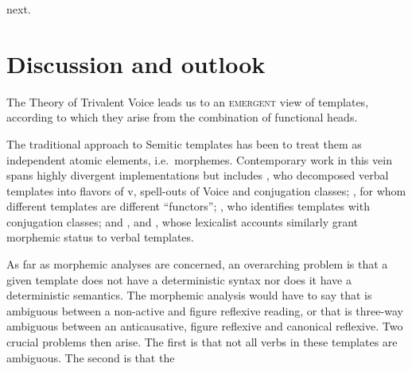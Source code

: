 \begin{exe}
\begin{xlist}
\begin{xlist}
\begin{exe}
\begin{xlist}
\begin{xlist}
\begin{exe}
\begin{xlist}
\begin{xlist}
\begin{exe}
\begin{exe}
\begin{xlist}
\begin{exe}
\begin{exe}
\begin{xlist}
\begin{exe}
\begin{exe}
\begin{exe}
\begin{exe}
\begin{exe}
\begin{xlist}
\begin{exe}
\begin{xlist}
\begin{exe}
\begin{exe}
\begin{xlist}
\begin{exe}
\begin{xlist}
\begin{exe}
\begin{xlist}
\begin{exe}
\begin{exe}
\begin{exe}
\begin{xlist}
\begin{exe}
\begin{exe}
\begin{exe}
\begin{xlist}
\begin{exe}
\begin{xlist}
\begin{exe}
\begin{xlist}
\begin{exe}
\begin{xlist}
\begin{exe}
\begin{exe}
\begin{exe}
\begin{exe}
\begin{xlist}
\begin{exe}
\begin{xlist}
\begin{exe}
\begin{xlist}
\begin{exe}
\begin{xlist}
\begin{exe}
\begin{xlist}
\begin{exe}
\begin{xlist}
\begin{exe}
\begin{exe}
\begin{exe}
\begin{exe}
\begin{xlist}
\begin{exe}
\begin{xlist}
\begin{exe}
\begin{xlist}
\begin{exe}
\begin{exe}
\begin{xlist}
\begin{exe}
\begin{xlist}
\begin{exe}
\begin{exe}
\begin{exe}
\begin{exe}
\begin{xlist}
\begin{xlist}
\begin{exe}
\begin{xlist}
\begin{exe}
\begin{exe}
\begin{exe}
\begin{xlist}
\begin{exe}
\begin{exe}
\begin{xlist}
\begin{exe}
\begin{exe}
\begin{exe}
\begin{xlist}
\begin{xlist}
\begin{exe}
\begin{xlist}
\begin{exe}
\begin{exe}
\begin{exe}
\begin{exe}
\begin{xlist}
\begin{exe}
\begin{xlist}
\begin{exe}
\begin{xlist}
\begin{exe}
\begin{xlist}
\begin{exe}
\begin{exe}
\begin{exe}
\begin{exe}
\begin{exe}
\begin{exe}
\begin{xlist}
\begin{exe}
\begin{xlist}
\begin{exe}
\begin{xlist}
\begin{exe}
\begin{xlist}
\begin{exe}
\begin{xlist}
next.


\section{Discussion and outlook} \label{vz:others}
The Theory of Trivalent Voice leads us to an \textsc{emergent} view of templates, according to which they arise from the combination of functional heads.

The traditional approach to Semitic templates has been to treat them as independent atomic elements, i.e.~morphemes. Contemporary work in this vein spans highly divergent implementations but includes \cite{arad03,arad05}, who decomposed verbal templates into flavors of v, spell-outs of Voice and conjugation classes; \cite{borer13oup}, for whom different templates are different ``functors''; \cite{aronoff94,aronoff07}, who identifies templates with conjugation classes; and \cite{reinhartsiloni05}, \cite{schwarzwald08} and \cite{laks11,laks14}, whose lexicalist accounts similarly grant morphemic status to verbal templates.

As far as morphemic analyses are concerned, an overarching problem is that a given template does not have a deterministic syntax nor does it have a deterministic semantics. The morphemic analysis would have to say that {\tnif} is ambiguous between a non-active and figure reflexive reading, or that {\thit} is three-way ambiguous between an anticausative, figure reflexive and canonical reflexive. Two crucial problems then arise. The first is that not all verbs in these templates are ambiguous. The second is that the 
\end{xlist}
\end{exe}
\end{xlist}
\end{exe}
\end{xlist}
\end{exe}
\end{xlist}
\end{exe}
\end{xlist}
\end{exe}
\end{exe}
\end{exe}
\end{exe}
\end{exe}
\end{exe}
\end{xlist}
\end{exe}
\end{xlist}
\end{exe}
\end{xlist}
\end{exe}
\end{xlist}
\end{exe}
\end{exe}
\end{exe}
\end{exe}
\end{xlist}
\end{exe}
\end{xlist}
\end{xlist}
\end{exe}
\end{exe}
\end{exe}
\end{xlist}
\end{exe}
\end{exe}
\end{xlist}
\end{exe}
\end{exe}
\end{exe}
\end{xlist}
\end{exe}
\end{xlist}
\end{xlist}
\end{exe}
\end{exe}
\end{exe}
\end{exe}
\end{xlist}
\end{exe}
\end{xlist}
\end{exe}
\end{exe}
\end{xlist}
\end{exe}
\end{xlist}
\end{exe}
\end{xlist}
\end{exe}
\end{exe}
\end{exe}
\end{exe}
\end{xlist}
\end{exe}
\end{xlist}
\end{exe}
\end{xlist}
\end{exe}
\end{xlist}
\end{exe}
\end{xlist}
\end{exe}
\end{xlist}
\end{exe}
\end{exe}
\end{exe}
\end{exe}
\end{xlist}
\end{exe}
\end{xlist}
\end{exe}
\end{xlist}
\end{exe}
\end{xlist}
\end{exe}
\end{exe}
\end{exe}
\end{xlist}
\end{exe}
\end{exe}
\end{exe}
\end{xlist}
\end{exe}
\end{xlist}
\end{exe}
\end{xlist}
\end{exe}
\end{exe}
\end{xlist}
\end{exe}
\end{xlist}
\end{exe}
\end{exe}
\end{exe}
\end{exe}
\end{exe}
\end{xlist}
\end{exe}
\end{exe}
\end{xlist}
\end{exe}
\end{exe}
\end{xlist}
\end{xlist}
\end{exe}
\end{xlist}
\end{xlist}
\end{exe}
\end{xlist}
\end{xlist}
\end{exe}
